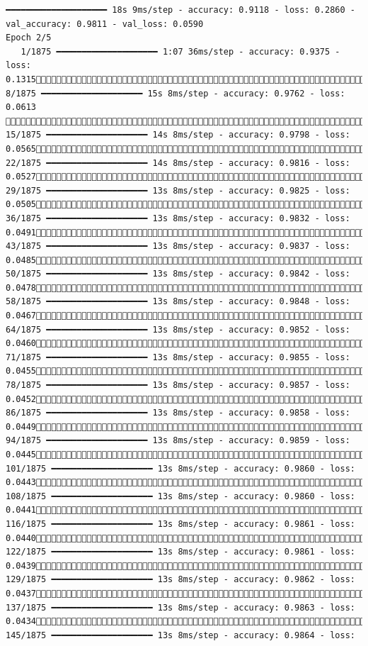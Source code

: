 \documentclass[
  letterpaper,
  DIV=11,
  numbers=noendperiod]{scrreprt}
\begin{document}
\begin{verbatim}
━━━━━━━━━━━━━━━━━━━━ 18s 9ms/step - accuracy: 0.9118 - loss: 0.2860 - val_accuracy: 0.9811 - val_loss: 0.0590
Epoch 2/5
   1/1875 ━━━━━━━━━━━━━━━━━━━━ 1:07 36ms/step - accuracy: 0.9375 - loss: 0.1315   8/1875 ━━━━━━━━━━━━━━━━━━━━ 15s 8ms/step - accuracy: 0.9762 - loss: 0.0613    15/1875 ━━━━━━━━━━━━━━━━━━━━ 14s 8ms/step - accuracy: 0.9798 - loss: 0.0565  22/1875 ━━━━━━━━━━━━━━━━━━━━ 14s 8ms/step - accuracy: 0.9816 - loss: 0.0527  29/1875 ━━━━━━━━━━━━━━━━━━━━ 13s 8ms/step - accuracy: 0.9825 - loss: 0.0505  36/1875 ━━━━━━━━━━━━━━━━━━━━ 13s 8ms/step - accuracy: 0.9832 - loss: 0.0491  43/1875 ━━━━━━━━━━━━━━━━━━━━ 13s 8ms/step - accuracy: 0.9837 - loss: 0.0485  50/1875 ━━━━━━━━━━━━━━━━━━━━ 13s 8ms/step - accuracy: 0.9842 - loss: 0.0478  58/1875 ━━━━━━━━━━━━━━━━━━━━ 13s 8ms/step - accuracy: 0.9848 - loss: 0.0467  64/1875 ━━━━━━━━━━━━━━━━━━━━ 13s 8ms/step - accuracy: 0.9852 - loss: 0.0460  71/1875 ━━━━━━━━━━━━━━━━━━━━ 13s 8ms/step - accuracy: 0.9855 - loss: 0.0455  78/1875 ━━━━━━━━━━━━━━━━━━━━ 13s 8ms/step - accuracy: 0.9857 - loss: 0.0452  86/1875 ━━━━━━━━━━━━━━━━━━━━ 13s 8ms/step - accuracy: 0.9858 - loss: 0.0449  94/1875 ━━━━━━━━━━━━━━━━━━━━ 13s 8ms/step - accuracy: 0.9859 - loss: 0.0445 101/1875 ━━━━━━━━━━━━━━━━━━━━ 13s 8ms/step - accuracy: 0.9860 - loss: 0.0443 108/1875 ━━━━━━━━━━━━━━━━━━━━ 13s 8ms/step - accuracy: 0.9860 - loss: 0.0441 116/1875 ━━━━━━━━━━━━━━━━━━━━ 13s 8ms/step - accuracy: 0.9861 - loss: 0.0440 122/1875 ━━━━━━━━━━━━━━━━━━━━ 13s 8ms/step - accuracy: 0.9861 - loss: 0.0439 129/1875 ━━━━━━━━━━━━━━━━━━━━ 13s 8ms/step - accuracy: 0.9862 - loss: 0.0437 137/1875 ━━━━━━━━━━━━━━━━━━━━ 13s 8ms/step - accuracy: 0.9863 - loss: 0.0434 145/1875 ━━━━━━━━━━━━━━━━━━━━ 13s 8ms/step - accuracy: 0.9864 - loss: 
\end{verbatim}
\end{document}
